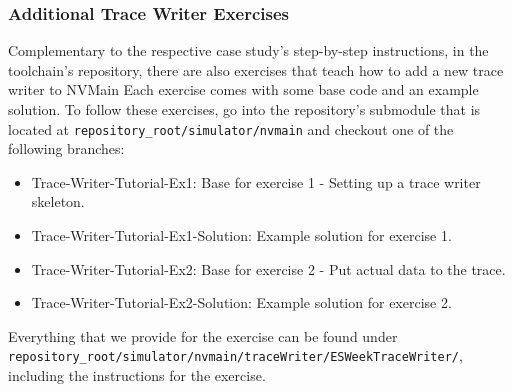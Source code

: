 \subsubsection*{Additional Trace Writer Exercises}
\label{app:tudo:exercises}
Complementary to the respective case study's step-by-step instructions, in the toolchain's repository, there are also exercises that teach how to add a new trace writer to NVMain Each exercise comes with some base code and an example solution. To follow these exercises, go into the repository's submodule that is located at \texttt{repository\_root/simulator/nvmain} and checkout one of the following branches:
\begin{itemize}
    \item Trace-Writer-Tutorial-Ex1: Base for exercise 1 - Setting up a trace writer skeleton.
    \item Trace-Writer-Tutorial-Ex1-Solution: Example solution for exercise 1.
    \item Trace-Writer-Tutorial-Ex2: Base for exercise 2 - Put actual data to the trace.
    \item Trace-Writer-Tutorial-Ex2-Solution: Example solution for exercise 2.
\end{itemize}
Everything that we provide for the exercise can be found under\\
\texttt{repository\_root/simulator/nvmain/traceWriter/ESWeekTraceWriter/},\\
including the instructions for the exercise.

